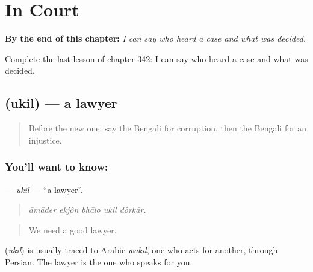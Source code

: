 
\chapter{In Court}
\label{ch:bn-in-court}

\begin{chapteropening}
\textbf{By the end of this chapter:} \emph{I can say who heard a case and what was decided.}

Complete the last lesson of chapter 342: I can say who heard a case and what was decided.
\end{chapteropening}

\section[\texorpdfstring{\bn{উকিল} (ukil)}{উকিল (ukil)}]{ (ukil) — a lawyer}

\label{lesson:BN-C342-ukil}



\begin{quote}
Before the new one: say the Bengali for corruption, then the Bengali for an injustice.
\end{quote}

\subsection*{You'll want to know: }
\textbf{} — \emph{ukil} — \textquotedblleft{}a lawyer\textquotedblright{}.

\begin{quote}
    
\end{quote}

\begin{quote}
\emph{āmāder ekjôn bhālo ukil dôrkār.}
\end{quote}

\begin{quote}
We need a good lawyer.
\end{quote}

\begin{cousinweb}
\textbf{} (\emph{ukil}) is usually traced to Arabic \emph{wakīl}, one who acts for another, through Persian. The lawyer is the one who speaks for you.
\end{cousinweb}

